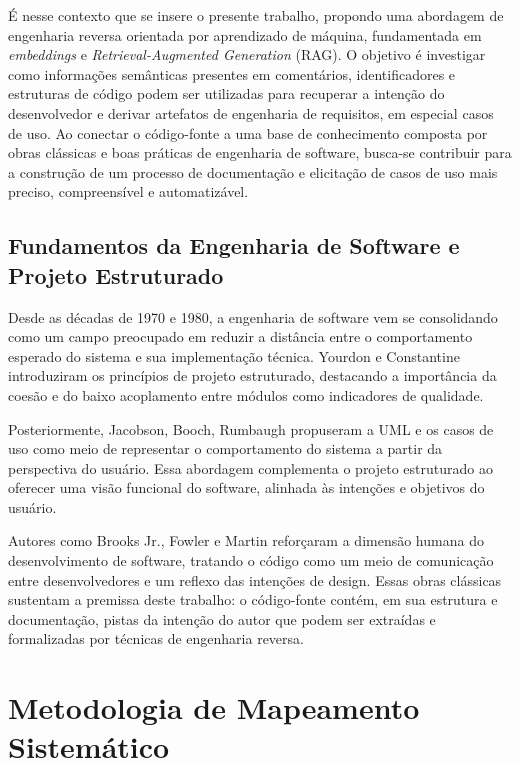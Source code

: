 \documentclass[12pt,a4paper]{article}
\begin{document}
É nesse contexto que se insere o presente trabalho, propondo uma abordagem de engenharia reversa orientada por aprendizado de máquina, fundamentada em \textit{embeddings} e \textit{Retrieval-Augmented Generation} (RAG). O objetivo é investigar como informações semânticas presentes em comentários, identificadores e estruturas de código podem ser utilizadas para recuperar a intenção do desenvolvedor e derivar artefatos de engenharia de requisitos, em especial casos de uso. Ao conectar o código-fonte a uma base de conhecimento composta por obras clássicas e boas práticas de engenharia de software, busca-se contribuir para a construção de um processo de documentação e elicitação de casos de uso mais preciso, compreensível e automatizável.

\subsection{Fundamentos da Engenharia de Software e Projeto Estruturado}

Desde as décadas de 1970 e 1980, a engenharia de software vem se consolidando como um campo preocupado em reduzir a distância entre o comportamento esperado do sistema e sua implementação técnica. Yourdon e Constantine introduziram os princípios de projeto estruturado, destacando a importância da coesão e do baixo acoplamento entre módulos como indicadores de qualidade.

Posteriormente, Jacobson, Booch, Rumbaugh propuseram a UML e os casos de uso como meio de representar o comportamento do sistema a partir da perspectiva do usuário. Essa abordagem complementa o projeto estruturado ao oferecer uma visão funcional do software, alinhada às intenções e objetivos do usuário.

Autores como Brooks Jr., Fowler e Martin reforçaram a dimensão humana do desenvolvimento de software, tratando o código como um meio de comunicação entre desenvolvedores e um reflexo das intenções de design. Essas obras clássicas sustentam a premissa deste trabalho: o código-fonte contém, em sua estrutura e documentação, pistas da intenção do autor que podem ser extraídas e formalizadas por técnicas de engenharia reversa.



\section{Metodologia de Mapeamento Sistemático}
\end{document}
